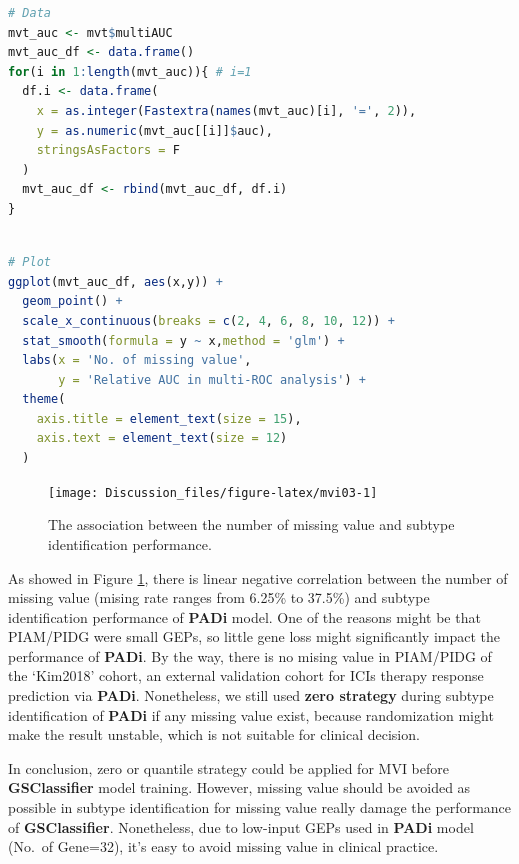 \documentclass[
  12pt,
]{book}
\begin{document}
\begin{lstlisting}[language=R]
# Data
mvt_auc <- mvt$multiAUC
mvt_auc_df <- data.frame()
for(i in 1:length(mvt_auc)){ # i=1
  df.i <- data.frame(
    x = as.integer(Fastextra(names(mvt_auc)[i], '=', 2)),
    y = as.numeric(mvt_auc[[i]]$auc),
    stringsAsFactors = F
  )
  mvt_auc_df <- rbind(mvt_auc_df, df.i)
}
  
\end{lstlisting}

\begin{lstlisting}[language=R]
# Plot
ggplot(mvt_auc_df, aes(x,y)) +
  geom_point() +
  scale_x_continuous(breaks = c(2, 4, 6, 8, 10, 12)) + 
  stat_smooth(formula = y ~ x,method = 'glm') +
  labs(x = 'No. of missing value', 
       y = 'Relative AUC in multi-ROC analysis') +
  theme(
    axis.title = element_text(size = 15),
    axis.text = element_text(size = 12)
  )
\end{lstlisting}

\begin{figure}

{\centering \texttt{[image: Discussion\_files/figure-latex/mvi03-1]} 

}

\caption{The association between the number of missing value and subtype identification performance.}\label{fig:mvi03}
\end{figure}

As showed in Figure \ref{fig:mvi03}, there is linear negative correlation between the number of missing value (mising rate ranges from 6.25\% to 37.5\%) and subtype identification performance of \textbf{PADi} model. One of the reasons might be that PIAM/PIDG were small GEPs, so little gene loss might significantly impact the performance of \textbf{PADi}. By the way, there is no mising value in PIAM/PIDG of the `Kim2018' cohort, an external validation cohort for ICIs therapy response prediction via \textbf{PADi}. Nonetheless, we still used \textbf{zero strategy} during subtype identification of \textbf{PADi} if any missing value exist, because randomization might make the result unstable, which is not suitable for clinical decision.

In conclusion, zero or quantile strategy could be applied for MVI before \textbf{GSClassifier} model training. However, missing value should be avoided as possible in subtype identification for missing value really damage the performance of \textbf{GSClassifier}. Nonetheless, due to low-input GEPs used in \textbf{PADi} model (No.~of Gene=32), it's easy to avoid missing value in clinical practice.
\end{document}
